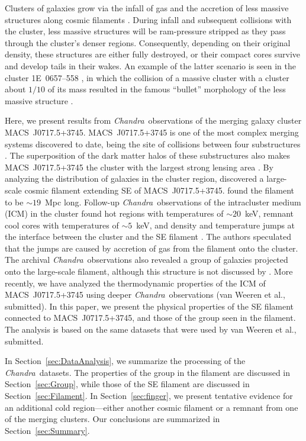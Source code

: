\documentclass[11pt,a4paper,useAMS,iop]{emulateapj}
\newcommand{\chandra}{\emph{Chandra}}
\begin{document}
Clusters of galaxies grow via the infall of gas and the accretion of less massive structures along cosmic filaments \citep[e.g.,][]{Springel2006}. During infall and subsequent collisions with the cluster, less massive structures will be ram-pressure stripped as they pass through the cluster's denser regions. Consequently, depending on their original density, these structures are either fully destroyed, or their compact cores survive and develop tails in their wakes. An example of the latter scenario is seen in the cluster 1E~0657--558 \citep{Elvis1992}, in which the collision of a massive cluster with a cluster about $1/10$ of its mass \citep{Springel2007, Mastropietro2008} resulted in the famous ``bullet'' morphology of the less massive structure \citep{Markevitch2002}.

Here, we present results from \chandra\ observations of the merging galaxy cluster MACS~J0717.5+3745. MACS~J0717.5+3745 \citep[$z=0.546$;][]{Ebeling2001, Ebeling2007} is one of the most complex merging systems discovered to date, being the site of collisions between four substructures \citep{Ma2009, Medezinski2013}. The superposition of the dark matter halos of these substructures also makes MACS~J0717.5+3745 the cluster with the largest strong lensing area \citep{Zitrin2009, Medezinski2013,Umetsu2014, Umetsu2016}. By analyzing the distribution of galaxies in the cluster region, \citet{Ebeling2004} discovered a large-scale cosmic filament extending SE of MACS~J0717.5+3745. \citet{Jauzac2012} found the filament to be $\sim 19$~Mpc long. Follow-up \chandra\ observations of the intracluster medium (ICM) in the cluster found hot regions with temperatures of $\sim 20$~keV, remnant cool cores with temperatures of $\sim 5$~keV, and density and temperature jumps at the interface between the cluster and the SE filament \citet{Ma2009}. The authors speculated that the jumps are caused by accretion of gas from the filament onto the cluster. The archival \chandra\ observations also revealed a group of galaxies projected onto the large-scale filament, although this structure is not discussed by \citet{Ma2009}. More recently, we have analyzed the thermodynamic properties of the ICM of MACS~J0717.5+3745 using deeper \chandra\ observations (van Weeren et al., submitted). In this paper, we present the physical properties of the SE filament connected to MACS~J0717.5+3745, and those of the group seen in the filament. The analysis is based on the same datasets that were used by van Weeren et al., submitted.

In Section~\ref{sec:DataAnalysis}, we summarize the processing of the \chandra\ datasets. The properties of the group in the filament are discussed in Section~\ref{sec:Group}, while those of the SE filament are discussed in Section~\ref{sec:Filament}. In Section~\ref{sec:finger}, we present tentative evidence for an additional cold region---either another cosmic filament or a remnant from one of the merging clusters. Our conclusions are summarized in Section~\ref{sec:Summary}.
\end{document}
